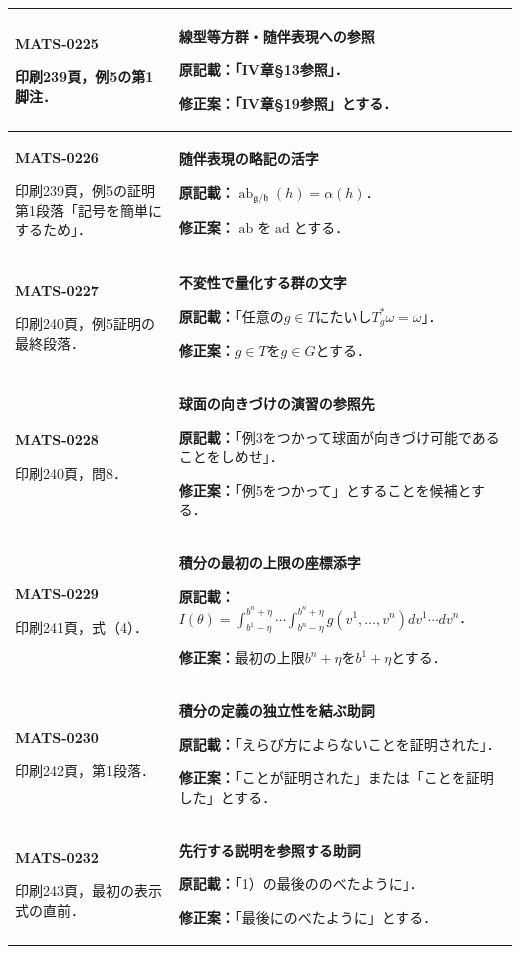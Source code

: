 \documentclass[a4paper,10pt]{ltjsarticle}
\begin{document}
\begin{longtable}{@{}>{\raggedright\arraybackslash}p{.19\linewidth}>{\raggedright\arraybackslash}p{.77\linewidth}@{}}
\hline
\hypertarget{MATS-0225}{}\textbf{MATS-0225}\par 印刷239頁，例5の第1脚注． & \textbf{線型等方群・随伴表現への参照}\par\textbf{原記載：}「IV章§13参照」．\par\textbf{修正案：}「IV章§19参照」とする． \\[3pt]
\hline
\hypertarget{MATS-0226}{}\textbf{MATS-0226}\par 印刷239頁，例5の証明第1段落「記号を簡単にするため」． & \textbf{随伴表現の略記の活字}\par\textbf{原記載：}$\operatorname{ab}_{\mathfrak g/\mathfrak h}(h)=\alpha(h)$．\par\textbf{修正案：}$\operatorname{ab}$を$\operatorname{ad}$とする． \\[3pt]
\hline
\hypertarget{MATS-0227}{}\textbf{MATS-0227}\par 印刷240頁，例5証明の最終段落． & \textbf{不変性で量化する群の文字}\par\textbf{原記載：}「任意の$g\in T$にたいし$T_g^*\omega=\omega$」．\par\textbf{修正案：}$g\in T$を$g\in G$とする． \\[3pt]
\hline
\hypertarget{MATS-0228}{}\textbf{MATS-0228}\par 印刷240頁，問8． & \textbf{球面の向きづけの演習の参照先}\par\textbf{原記載：}「例3をつかって球面が向きづけ可能であることをしめせ」．\par\textbf{修正案：}「例5をつかって」とすることを候補とする． \\[3pt]
\hline
\hypertarget{MATS-0229}{}\textbf{MATS-0229}\par 印刷241頁，式（4）． & \textbf{積分の最初の上限の座標添字}\par\textbf{原記載：}$I(\theta)=\int_{b^1-\eta}^{b^n+\eta}\cdots\int_{b^n-\eta}^{b^n+\eta}g(v^1,\ldots,v^n)dv^1\cdots dv^n$．\par\textbf{修正案：}最初の上限$b^n+\eta$を$b^1+\eta$とする． \\[3pt]
\hline
\hypertarget{MATS-0230}{}\textbf{MATS-0230}\par 印刷242頁，第1段落． & \textbf{積分の定義の独立性を結ぶ助詞}\par\textbf{原記載：}「えらび方によらないことを証明された」．\par\textbf{修正案：}「ことが証明された」または「ことを証明した」とする． \\[3pt]
\hline
\hypertarget{MATS-0232}{}\textbf{MATS-0232}\par 印刷243頁，最初の表示式の直前． & \textbf{先行する説明を参照する助詞}\par\textbf{原記載：}「1）の最後ののべたように」．\par\textbf{修正案：}「最後にのべたように」とする． \\[3pt]

\end{longtable}
\end{document}
